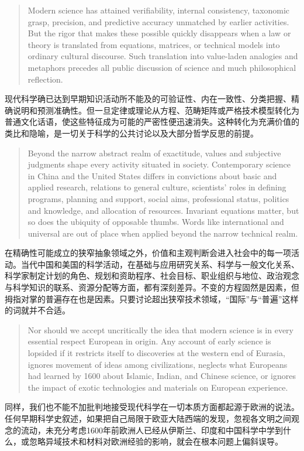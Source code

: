 \documentclass[UTF8,zihao=-4]{ctexart}
\newenvironment{enblock}
  {\par\smallskip\noindent{\scriptsize\bfseries English}\par\begin{quote}\small}
  {\end{quote}}
\newenvironment{zhblock}
  {\par\noindent{\scriptsize\bfseries 中文}\par}
  {\par\medskip}
\begin{document}
\begin{enblock}
Modern science has attained verifiability, internal consistency, taxonomic grasp, precision, and predictive accuracy unmatched by earlier activities. But the rigor that makes these possible quickly disappears when a law or theory is translated from equations, matrices, or technical models into ordinary cultural discourse. Such translation into value-laden analogies and metaphors precedes all public discussion of science and much philosophical reflection.
\end{enblock}
\begin{zhblock}
现代科学确已达到早期知识活动所不能及的可验证性、内在一致性、分类把握、精确说明和预测准确性。但一旦定律或理论从方程、范畴矩阵或严格技术模型转化为普通文化话语，使这些特征成为可能的严密性便迅速消失。这种转化为充满价值的类比和隐喻，是一切关于科学的公共讨论以及大部分哲学反思的前提。
\end{zhblock}

\begin{enblock}
Beyond the narrow abstract realm of exactitude, values and subjective judgments shape every activity situated in society. Contemporary science in China and the United States differs in convictions about basic and applied research, relations to general culture, scientists' roles in defining programs, planning and support, social aims, professional status, politics and knowledge, and allocation of resources. Invariant equations matter, but so does the ubiquity of opposable thumbs. Words like international and universal are out of place when applied beyond the narrow technical realm.
\end{enblock}
\begin{zhblock}
在精确性可能成立的狭窄抽象领域之外，价值和主观判断会进入社会中的每一项活动。当代中国和美国的科学活动，在基础与应用研究关系、科学与一般文化关系、科学家制定计划的角色、规划和资助程序、社会目标、职业组织与地位、政治观念与科学知识的联系、资源分配等方面，都有深刻差异。不变的方程固然是因素，但拇指对掌的普遍存在也是因素。只要讨论超出狭窄技术领域，“国际”与“普遍”这样的词就并不合适。
\end{zhblock}

\begin{enblock}
Nor should we accept uncritically the idea that modern science is in every essential respect European in origin. Any account of early science is lopsided if it restricts itself to discoveries at the western end of Eurasia, ignores movement of ideas among civilizations, neglects what Europeans had learned by 1600 about Islamic, Indian, and Chinese science, or ignores the impact of exotic technologies and materials on European experience.
\end{enblock}
\begin{zhblock}
同样，我们也不能不加批判地接受现代科学在一切本质方面都起源于欧洲的说法。任何早期科学史叙述，如果把自己局限于欧亚大陆西端的发现，忽视各文明之间观念的流动，未充分考虑1600年前欧洲人已经从伊斯兰、印度和中国科学中学到什么，或忽略异域技术和材料对欧洲经验的影响，就会在根本问题上偏斜误导。
\end{zhblock}
\end{document}
